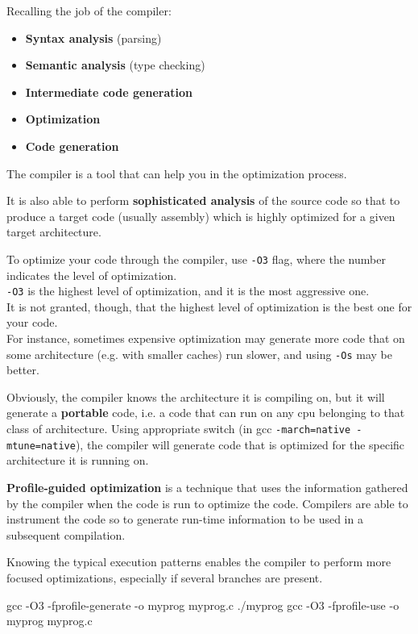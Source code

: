 \begin{observationblock}
    Recalling the job of the compiler:
    \begin{itemize}
        \item \textbf{Syntax analysis} (parsing)
        \item \textbf{Semantic analysis} (type checking)
        \item \textbf{Intermediate code generation}
        \item \textbf{Optimization}
        \item \textbf{Code generation}
    \end{itemize}
    The compiler is a tool that can help you in the optimization process.
    
    It is also able to perform \textbf{sophisticated analysis} of the source code so that to produce a target code (usually assembly) which is highly optimized for a given target architecture.
\end{observationblock}

To optimize your code through the compiler, use \texttt{-O3} flag, where the number indicates the level of optimization.\\
\texttt{-O3} is the highest level of optimization, and it is the most aggressive one.\\
It is not granted, though, that the highest level of optimization is the best one for your code.\\
For instance, sometimes expensive optimization may generate more code that on some architecture (e.g. with smaller caches) run slower, and using \texttt{-Os} may be better.

Obviously, the compiler knows the architecture it is compiling on, but it will generate a \textbf{portable} code, i.e. a code that can run on any cpu belonging to that class of architecture. 
Using appropriate switch (in gcc \texttt{-march=native -mtune=native}), the compiler will generate code that is optimized for the specific architecture it is running on.


\textbf{Profile-guided optimization} is a technique that uses the information gathered by the compiler when the code is run to optimize the code. Compilers are able to instrument the code so to generate run-time information to be used in a subsequent compilation. 

Knowing the typical execution patterns enables the compiler to perform more focused optimizations, especially if several branches are present.
\begin{codeblock}[language=bash]
gcc -O3 -fprofile-generate -o myprog myprog.c
./myprog
gcc -O3 -fprofile-use -o myprog myprog.c
\end{codeblock}

